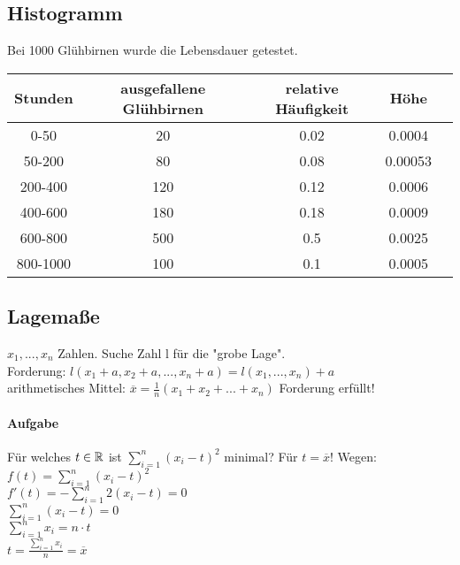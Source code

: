 
\subsection{Histogramm}
Bei 1000 Glühbirnen wurde die Lebensdauer getestet.\\ %
\begin{tabular}{|c|c|c|c|c|}
\hline Stunden & ausgefallene Glühbirnen & relative Häufigkeit & Höhe \\ 
\hline 0-50 & 20 & 0.02 & 0.0004 \\ 
\hline 50-200 & 80 & 0.08 & 0.00053 \\ 
\hline 200-400 & 120 & 0.12 & 0.0006 \\ 
\hline 400-600 & 180 & 0.18 & 0.0009 \\ 
\hline 600-800 & 500 & 0.5 & 0.0025 \\ 
\hline 800-1000 & 100 & 0.1 & 0.0005 \\ 
\hline 
\end{tabular} 


\subsection{Lagemaße}
$ x_1, ..., x_n $ Zahlen. Suche Zahl l für die "grobe Lage".\\
Forderung: $ l(x_1+a, x_2+a, ..., x_n+a) = l(x_1, ..., x_n) + a $\\
arithmetisches Mittel: $ \overline{x} = \frac{1}{n}(x_1+x_2+...+x_n) $ Forderung erfüllt!

\paragraph{Aufgabe} Für welches $t\in \mathbb{R}$ ist $ \sum_{i=1}^{n}(x_i-t)^2 $ minimal? Für $t=\overline{x}$! Wegen: $ f(t)=\sum_{i=1}^{n}(x_i-t)^2 $\\
$ f'(t) = -\sum_{i=1}^{n}2(x_i-t) = 0 $\\
$ \sum_{i=1}^{n}(x_i-t) = 0 $\\
$ \sum_{i=1}^{n} x_i = n\cdot t $\\
$ t = \frac{\sum_{i=1}^{n}x_i}{n} = \overline{x} $

